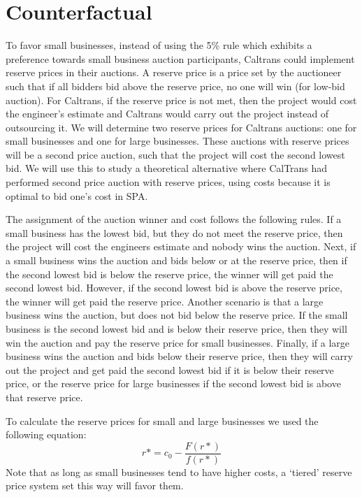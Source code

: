 \section{Counterfactual}
 
To favor small businesses, instead of using the 5\% rule which exhibits
a preference towards small business auction participants, Caltrans could implement reserve prices in their auctions. A reserve price is a price set by the auctioneer such that if all bidders bid above the reserve price, no one will win (for low-bid auction). For Caltrans, if the reserve price is not met, then the project would cost the engineer's estimate and Caltrans would carry out the project instead of outsourcing it. We will determine two reserve prices for Caltrans auctions: one for small businesses and one for large businesses. These auctions with reserve prices will be a second price auction, such that the project will cost the second lowest bid.
We will use this to study a theoretical alternative where
CalTrans had performed second price auction with reserve prices,
using costs because it is optimal to bid one's cost in SPA.

The assignment of the auction winner and cost follows the following rules.
If a small business has the lowest bid, but they do not meet the reserve price, then the project will cost the engineers estimate and nobody wins the auction.
Next, if a small business wins the auction and bids below or at the reserve price, then if the second lowest bid is below the reserve price, the winner will get paid the second lowest bid.
However, if the second lowest bid is above the reserve price, the winner will get paid the reserve price.
Another scenario is that a large business wins the auction, but does not bid below the reserve price.
If the small business is the second lowest bid and is below their reserve price, then they will win the auction and pay the reserve price for
small businesses.
Finally, if a large business wins the auction and bids below their reserve price, then they will carry out the project and get paid the second lowest bid if it is below their reserve price, or the reserve price for large
businesses if the second lowest bid is above that reserve price.
 
To calculate the reserve prices for small and large businesses we used the following equation: \[r*=c_0 - \frac{F(r*)}{f(r*)}\]
Note that as long as small businesses tend to have higher costs, a `tiered'
reserve price system set this way will favor them.
 
